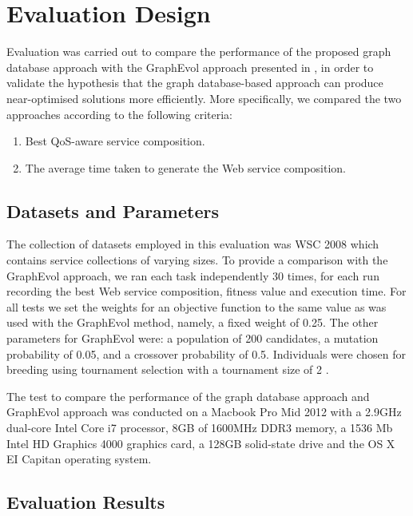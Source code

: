 \chapter{Evaluation Design}\label{C:ed}
Evaluation was carried out to compare the performance of the proposed graph database approach with the GraphEvol approach presented in \cite{2}, in order to validate the hypothesis that the graph database-based approach can produce near-optimised solutions more efficiently. More specifically, we compared the two approaches according to the following criteria:

\begin{enumerate}
  \item Best QoS-aware service composition.
  \item The average time taken to generate the Web service composition.
\end{enumerate}

\section{Datasets and Parameters} 
The collection of datasets employed in this evaluation was WSC 2008 \cite{12} which contains service collections of varying sizes. To provide a comparison with the GraphEvol approach, we ran each task independently 30 times, for each run recording the best Web service composition, fitness value and execution time. For all tests we set the weights for an objective function to the same value as was used with the GraphEvol method, namely, a fixed weight of 0.25. The other parameters for GraphEvol were: a population of 200 candidates, a mutation probability of 0.05, and a crossover probability of 0.5. Individuals were chosen for breeding using tournament selection with a tournament size of 2 \cite{2}.\par

The test to compare the performance of the graph database approach and GraphEvol approach was conducted on a Macbook Pro Mid 2012 with a 2.9GHz dual-core Intel Core i7 processor, 8GB of 1600MHz DDR3 memory, a 1536 Mb Intel HD Graphics 4000 graphics card, a 128GB solid-state drive and the OS X EI Capitan operating system.

\section{Evaluation Results} 

